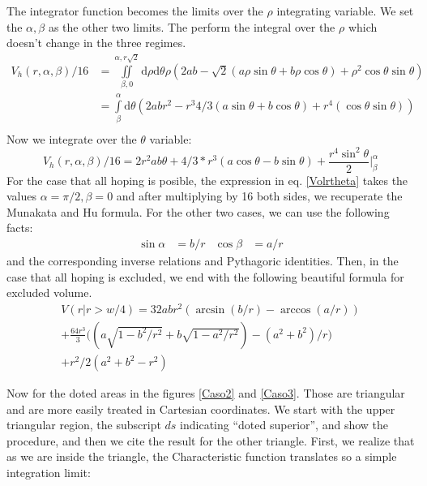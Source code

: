 \documentclass[letterpaper,10pt, jcp, aps]{revtex4-1}
\newcommand{\rd}{\!\mathrm{d}}
\begin{document}
The integrator function becomes the limits over the $\rho$ integrating variable.
We set the $\alpha, \beta$ as the other two limits. The perform the
integral over the $\rho$ which doesn't change in the three regimes.
\begin{equation}
  \begin{split}
 V_h(r,\alpha,\beta)/16 &=\iint\limits_{\beta,0}^{\alpha,r\sqrt{2}} \rd \rho \rd \theta \rho (2ab
-\sqrt{2}(a\rho\sin\theta+b\rho\cos\theta)
+\rho^2 \cos\theta\sin\theta)\\
 &=\int\limits_\beta^{\alpha}  \rd \theta  
(2abr^2 - r^3 4/3 (a\sin\theta+b\cos\theta)+r^4 (\cos\theta\sin\theta))\\
\end{split}
  \end{equation}
Now we integrate over the $\theta$ variable:
\begin{equation}\label{Volrtheta}
  V_h(r,\alpha,\beta)/16 = 2r^2ab\theta+4/3*r^3(a\cos\theta-b\sin\theta)
  +\frac{r^4 \sin^2\theta}{2} \Bigg\vert_\beta^\alpha
\end{equation}
For the case that all hoping is posible, the expression in eq. \ref{Volrtheta}
takes the values $\alpha=\pi/2, \beta=0$ and after multiplying by 16 both sides,
we recuperate the Munakata and Hu formula. For the other two cases, we can use the following
facts:
\begin{align}
  \sin\alpha&=b/r & \cos\beta&=a/r 
\end{align}
and the corresponding inverse relations and Pythagoric identities.
Then, in the case that all hoping is excluded, we end with the following beautiful
formula for excluded volume.
\begin{multline}\label{VolCaso3}
  V(r \vert r>w/4 )=32abr^2(\arcsin(b/r)-\arccos(a/r))\\
  +\frac{64r^3}{3}\biggl((a\sqrt{1-b^2/r^2}+b\sqrt{1-a^2/r^2})-(a^2+b^2)/r\biggr)\\
  +r^2/2(a^2+b^2-r^2)
\end{multline}

Now for the doted areas in the figures \ref{Caso2} and \ref{Caso3}. Those are triangular
and are more easily treated in Cartesian coordinates. We start with the upper
triangular region, the subscript $ds$ indicating ``doted superior'',
and show the procedure, and then we cite the result for the
other triangle.
First, we realize that as we are inside the triangle, the Characteristic function
translates so a simple integration limit:
\end{document}
